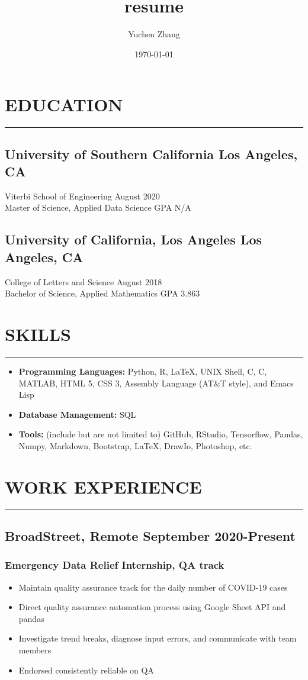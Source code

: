 \documentclass{article}
\title{resume}
\author{Yuchen Zhang}
\date{\today}
\newcommand\CC{C\nolinebreak[4]\hspace{-.05em}\raisebox{.4ex}{\relsize{-3}{\textbf{++}}}}
\newcommand{\divider}{\vskip2pt\hrule\vskip2pt}
\begin{document}
	\section*{EDUCATION}
	\divider
		\subsection*{University of Southern California \hfill {\normalfont Los Angeles, CA}}
		\noindent
		Viterbi School of Engineering \hfill August 2020 \\
		Master of Science, Applied Data Science \hfill GPA N/A \\
		
		\subsection*{University of California, Los Angeles \hfill {\normalfont Los Angeles, CA}}
		\noindent
		College of Letters and Science \hfill August 2018 \\
		Bachelor of Science, Applied Mathematics \hfill GPA 3.863 \\
		
	\section*{SKILLS}
	\divider
	\begin{itemize}[leftmargin=*]
		\setlength\itemsep{1pt}
		\item[] \textbf{Programming Languages:} Python, R, \LaTeX, UNIX Shell, C, \CC, MATLAB, HTML 5, CSS 3, Assembly Language (AT\&T style), and Emacs Lisp
		\item[] \textbf{Database Management:} SQL
		\item[] \textbf{Tools:} (include but are not limited to) GitHub, RStudio, Tensorflow, Pandas, Numpy, Markdown, Bootstrap, \LaTeX, DrawIo, Photoshop, etc.
	\end{itemize}
		
	\section*{WORK EXPERIENCE}
	\divider
		\subsection*{BroadStreet{\normalfont, Remote \hfill September 2020-Present}}
			\subsubsection*{Emergency Data Relief Internship, QA track}
			\begin{itemize}
				\setlength\itemsep{-1pt}
				\item Maintain quality assurance track for the daily number of COVID-19 cases 
				\item Direct quality assurance automation process using Google Sheet API and pandas
				\item Investigate trend breaks, diagnose input errors, and communicate with team members
				\item Endorsed consistently reliable on QA
			\end{itemize}
		
\end{document}
